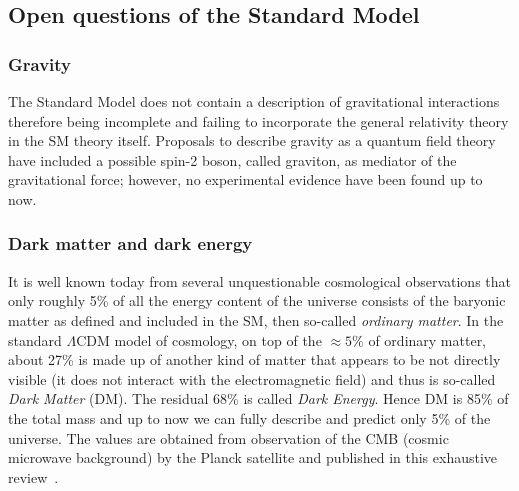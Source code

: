 \subsection{Open questions of the Standard Model}\label{sec:questions}
\subsubsection{Gravity}
The Standard Model does not contain a description of gravitational interactions therefore being incomplete and failing to incorporate the general relativity theory in the SM theory itself. Proposals to describe gravity as a quantum field theory have included a possible spin-2 boson, called graviton, as mediator of the gravitational force; however, no experimental evidence have been found up to now. 

\subsubsection{Dark matter and dark energy}

It is well known today from several unquestionable cosmological observations that only roughly 5$\%$ of all the energy content of the universe consists of the baryonic matter as defined and included in the SM, then so-called \emph{ordinary matter}. In the standard $\Lambda$CDM model of cosmology, on top of the $\approx 5\%$ of ordinary matter, about 27\% is made up of another kind of matter that appears to be not directly visible (it does not interact with the electromagnetic field) and thus is so-called \emph{Dark Matter} (DM). The residual 68\% is called \emph{Dark Energy}. Hence DM is 85\% of the total mass and up to now we can fully describe and predict only 5\% of the universe. The values are obtained from observation of the CMB (cosmic microwave background) by the Planck satellite and published in this exhaustive review~\cite{2020Plank}.

